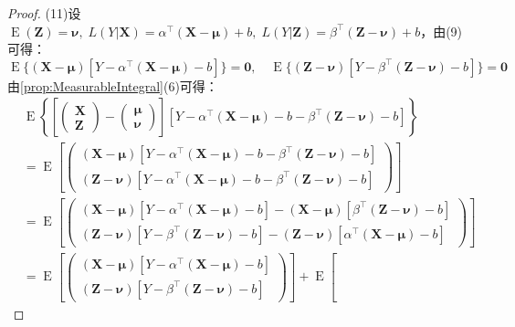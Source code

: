 \begin{proof}
	(11)设$\operatorname{E}(\mathbf{Z})=\boldsymbol{\nu},\;L(Y|\mathbf{X})=\alpha^{\top}(\mathbf{X}-\boldsymbol{\mu})+b,\;L(Y|\mathbf{Z})=\beta^{\top}(\mathbf{Z}-\boldsymbol{\nu})+b$，由(9)可得：
	\begin{equation*}
		\operatorname{E}\{(\mathbf{X}-\boldsymbol{\mu})[Y-\alpha^{\top}(\mathbf{X}-\boldsymbol{\mu})-b]\}=\mathbf{0},\quad
		\operatorname{E}\{(\mathbf{Z}-\boldsymbol{\nu})[Y-\beta^{\top}(\mathbf{Z}-\boldsymbol{\nu})-b]\}=\mathbf{0}
	\end{equation*}
	由\cref{prop:MeasurableIntegral}(6)可得：
	\begin{align*}
		&\operatorname{E}\left\{\left[
		\begin{pmatrix}
			\mathbf{X} \\
			\mathbf{Z}
		\end{pmatrix}-
		\begin{pmatrix}
			\boldsymbol{\mu} \\
			\boldsymbol{\nu}
		\end{pmatrix}
		\right][Y-\alpha^{\top}(\mathbf{X}-\boldsymbol{\mu})-b-\beta^{\top}(\mathbf{Z}-\boldsymbol{\nu})-b]\right\} \\
		&=\operatorname{E}\left[
		\begin{pmatrix}
			(\mathbf{X}-\boldsymbol{\mu})[Y-\alpha^{\top}(\mathbf{X}-\boldsymbol{\mu})-b-\beta^{\top}(\mathbf{Z}-\boldsymbol{\nu})-b] \\
			(\mathbf{Z}-\boldsymbol{\nu})[Y-\alpha^{\top}(\mathbf{X}-\boldsymbol{\mu})-b-\beta^{\top}(\mathbf{Z}-\boldsymbol{\nu})-b]
		\end{pmatrix}
		\right] \\
		&=\operatorname{E}\left[
		\begin{pmatrix}
			(\mathbf{X}-\boldsymbol{\mu})[Y-\alpha^{\top}(\mathbf{X}-\boldsymbol{\mu})-b]-(\mathbf{X}-\boldsymbol{\mu})[\beta^{\top}(\mathbf{Z}-\boldsymbol{\nu})-b] \\
			(\mathbf{Z}-\boldsymbol{\nu})[Y-\beta^{\top}(\mathbf{Z}-\boldsymbol{\nu})-b]-(\mathbf{Z}-\boldsymbol{\nu})[\alpha^{\top}(\mathbf{X}-\boldsymbol{\mu})-b]
		\end{pmatrix}
		\right] \\
		&=\operatorname{E}\left[
		\begin{pmatrix}
			(\mathbf{X}-\boldsymbol{\mu})[Y-\alpha^{\top}(\mathbf{X}-\boldsymbol{\mu})-b] \\
			(\mathbf{Z}-\boldsymbol{\nu})[Y-\beta^{\top}(\mathbf{Z}-\boldsymbol{\nu})-b]
		\end{pmatrix}
		\right]+\operatorname{E}\left[

\end{align*}
\end{proof}
